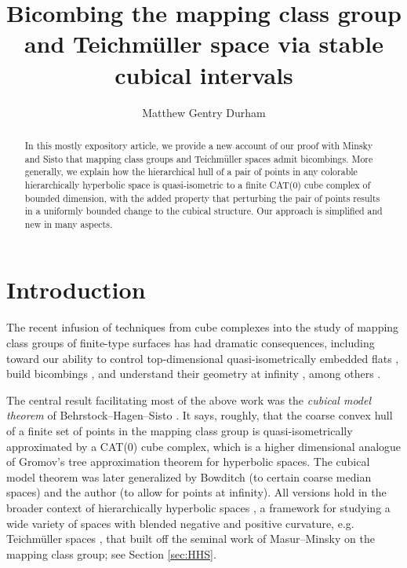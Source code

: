 \documentclass{amsart}
\theoremstyle{definition}
\theoremstyle{remark}
\theoremstyle{definition}
\begin{document}
\title[Bicombing MCG and Teich via stable cubical intervals]{Bicombing the mapping class group and Teichm\"uller space via stable cubical intervals}





 
 
 \author   {Matthew Gentry Durham}
 \address{Department of Mathematics and Statistics, CUNY Hunter College, New York, NY }
 
 


 
 


\begin{abstract}
In this mostly expository article, we provide a new account of our proof with Minsky and Sisto that mapping class groups and Teichm\"uller spaces admit bicombings.  More generally, we explain how the hierarchical hull of a pair of points in any colorable hierarchically hyperbolic space is quasi-isometric to a finite CAT(0) cube complex of bounded dimension, with the added property that perturbing the pair of points results in a uniformly bounded change to the cubical structure.  Our approach is simplified and new in many aspects.

\end{abstract}




\maketitle


\section{Introduction} \label{sec:intro}

The recent infusion of techniques from cube complexes into the study of mapping class groups of finite-type surfaces has had dramatic consequences, including toward our ability to control top-dimensional quasi-isometrically embedded flats \cite{HHS_quasi}, build bicombings \cite{DMS_bary, HHP}, and understand their geometry at infinity \cite{DZ22, Ham_boundary, Dur_infcube}, among others \cite{ABD, Petyt_quasicube, DZ22, zalloum2025effective}.

The central result facilitating most of the above work was the \emph{cubical model theorem} of Behrstock--Hagen--Sisto \cite{HHS_quasi}.  It says, roughly, that the coarse convex hull of a finite set of points in the mapping class group is quasi-isometrically approximated by a CAT(0) cube complex, which is a higher dimensional analogue of Gromov's tree approximation theorem for hyperbolic spaces.  The cubical model theorem was later generalized by Bowditch \cite{Bowditch_hulls} (to certain coarse median spaces) and the author \cite{Dur_infcube} (to allow for points at infinity).  All versions hold in the broader context of hierarchically hyperbolic spaces \cite{HHS_I}, a framework for studying a wide variety of spaces with blended negative and positive curvature, e.g. Teichm\"uller spaces \cite{Brock, Rafi:hypteich, Dur:augmented}, that built off the seminal work of Masur--Minsky \cite{MM99,MM00} on the mapping class group; see Section \ref{sec:HHS}. 
\end{document}
